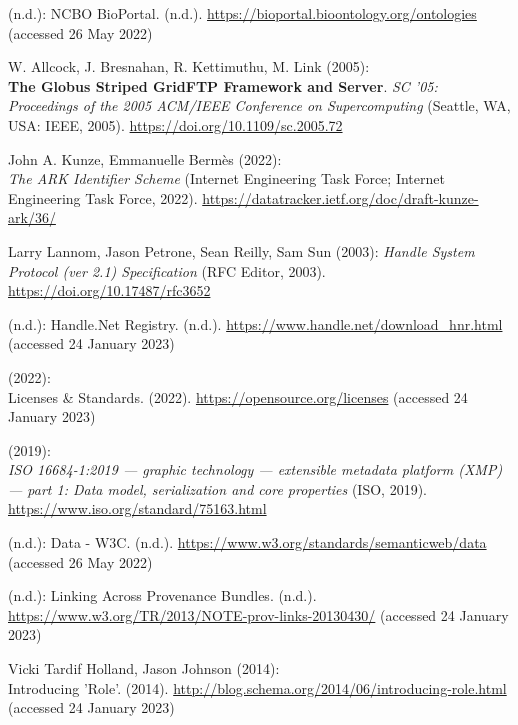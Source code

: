 \begin{thebibliography}{9}
(n.d.): {NCBO BioPortal}. (n.d.).
\url{https://bioportal.bioontology.org/ontologies} (accessed 26 May
2022)

W. Allcock, J. Bresnahan, R. Kettimuthu, M. Link (2005): \\
\textbf{The
{Globus Striped GridFTP Framework} and {Server}}. \emph{{SC '05:
Proceedings of the 2005 ACM/IEEE Conference on Supercomputing}}
({Seattle, WA, USA}: {IEEE}, 2005).
\url{https://doi.org/10.1109/sc.2005.72}

John A. Kunze, Emmanuelle Bermès (2022): \\
\emph{{The ARK Identifier
Scheme}} (Internet Engineering Task Force; Internet Engineering Task
Force, 2022). \url{https://datatracker.ietf.org/doc/draft-kunze-ark/36/}

Larry Lannom, Jason Petrone, Sean Reilly, Sam Sun (2003):
\emph{Handle {System Protocol} (ver 2.1) {Specification}} ({RFC Editor},
2003).
\url{https://doi.org/10.17487/rfc3652}

(n.d.): Handle.{Net Registry}. (n.d.).
\url{https://www.handle.net/download_hnr.html} (accessed 24 January
2023)

(2022): \\
Licenses \& {Standards}. (2022).
\url{https://opensource.org/licenses} (accessed 24 January 2023)

(2019): \\
\emph{{ISO} 16684-1:2019 --- graphic technology --- extensible
metadata platform (XMP) --- part 1: Data model, serialization and core
properties} ({ISO}, 2019). \url{https://www.iso.org/standard/75163.html}

(n.d.): Data - {W3C}. (n.d.).
\url{https://www.w3.org/standards/semanticweb/data} (accessed 26 May
2022)

(n.d.): Linking {Across Provenance Bundles}. (n.d.).
\url{https://www.w3.org/TR/2013/NOTE-prov-links-20130430/} (accessed 24
January 2023)

Vicki Tardif Holland, Jason Johnson (2014): \\
Introducing '{Role}'.
(2014). \url{http://blog.schema.org/2014/06/introducing-role.html}
(accessed 24 January 2023)


\end{thebibliography}
